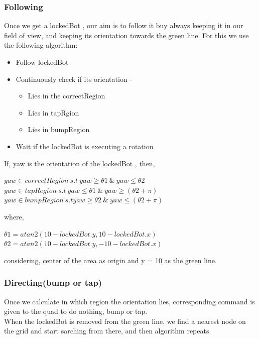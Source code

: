 \documentclass[12pt]{article}
\begin{document}
\begin{itemize}
	\subsubsection{Following}
		Once we get a lockedBot , our aim is to follow it buy always keeping it in our field of view, and keeping
its orientation towards the green line. For this we use the following algorithm:
\begin{itemize}
	\item Follow lockedBot
	\item Continuously check if its orientation - 
		\begin{itemize}
			\item Lies in the correctRegion
			\item Lies in tapRgion
			\item Lies in bumpRegion
		\end{itemize}
	\item Wait if the lockedBot is executing a rotation
\end{itemize}

If, yaw is the orientation of the lockedBot , then, \\

\begin{center}

$yaw \in correctRegion  \ s.t \ yaw  \geq \theta1 \  \&  \ yaw  \leq \theta2$\\ 
$yaw \in tapRegion \ s.t \ yaw  \leq \theta1 \ \& \ yaw  \geq (\theta2 + \pi)$\\
$yaw \in bumpRegion \  s.t yaw \geq \theta2 \  \& \ yaw  \leq (\theta2 + \pi)$\\
  	
\end{center}

where, 

\begin{center}
$\theta1 = atan2(10 - lockedBot.y, 10 - lockedBot.x)$\\
$\theta2 = atan2(10 - lockedBot.y, -10 - lockedBot.x)$\\
\end{center}    

considering, center of the area as origin and y = 10 as the green line.

	\subsubsection{Directing(bump or tap)}
		Once we calculate in which region the orientation lies, corresponding command is given to the quad to do
nothing, bump or tap. \\
When the lockedBot is removed from the green line, we find a nearest node on the grid and start sarching from there, and then algorithm repeats.




\end{itemize}
\end{document}
